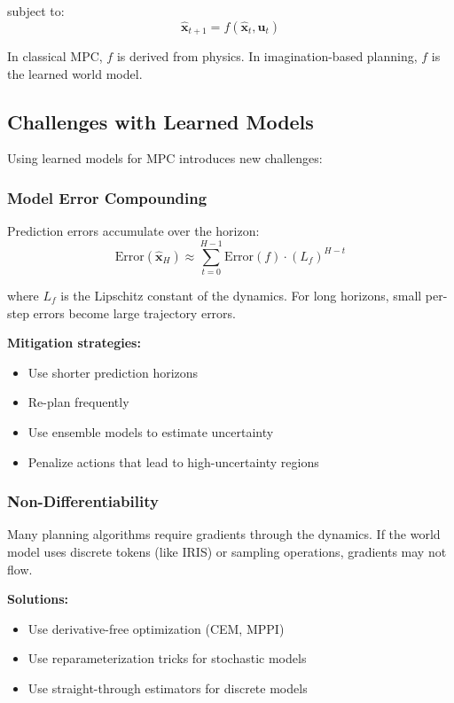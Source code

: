 subject to:
\begin{equation}
\hat{\mathbf{x}}_{t+1} = f(\hat{\mathbf{x}}_t, \mathbf{u}_t)
\end{equation}

In classical MPC, $f$ is derived from physics. In imagination-based planning, $f$ is the learned world model.

\subsection{Challenges with Learned Models}

Using learned models for MPC introduces new challenges:

\subsubsection{Model Error Compounding}

Prediction errors accumulate over the horizon:
\begin{equation}
\text{Error}(\hat{\mathbf{x}}_H) \approx \sum_{t=0}^{H-1} \text{Error}(f) \cdot (L_f)^{H-t}
\end{equation}

where $L_f$ is the Lipschitz constant of the dynamics. For long horizons, small per-step errors become large trajectory errors.

\textbf{Mitigation strategies:}
\begin{itemize}
    \item Use shorter prediction horizons
    \item Re-plan frequently
    \item Use ensemble models to estimate uncertainty
    \item Penalize actions that lead to high-uncertainty regions
\end{itemize}

\subsubsection{Non-Differentiability}

Many planning algorithms require gradients through the dynamics. If the world model uses discrete tokens (like IRIS) or sampling operations, gradients may not flow.

\textbf{Solutions:}
\begin{itemize}
    \item Use derivative-free optimization (CEM, MPPI)
    \item Use reparameterization tricks for stochastic models
    \item Use straight-through estimators for discrete models
\end{itemize}

